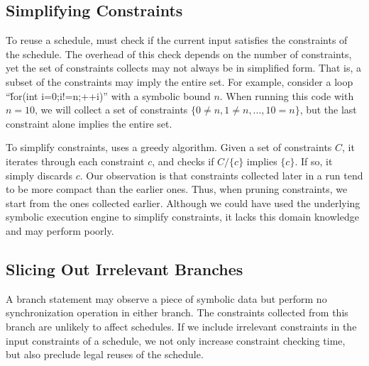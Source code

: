 



\subsection{Simplifying Constraints} \label{sec:tern-simplify}

To reuse a schedule, \tern must check if the current input satisfies the
constraints of the schedule.  The overhead of this check depends on the
number of constraints, yet the set of constraints \tern collects may not
always be in simplified form.  That is, a subset of the constraints may
imply the entire set.  For example, consider a loop ``\v{for(int
  i=0;i!=n;++i)}'' with a symbolic bound $n$.  When running this code with
$n=10$, we will collect a set of constraints $\{0 \neq n, 1 \neq n, ...,
10 = n\}$, but the last constraint alone implies the entire set.

To simplify constraints, \tern uses a greedy algorithm.  Given a set of
constraints $C$, it iterates through each constraint $c$, and checks if
$C/\{c\}$ implies $\{c\}$.  If so, it simply discards $c$.  Our
observation is that constraints collected later in a run tend to be more
compact than the earlier ones.  Thus, when pruning constraints, we start
from the ones collected earlier.  Although we could have used the
underlying symbolic execution engine to simplify constraints, it lacks
this domain knowledge and may perform poorly.

\subsection{Slicing Out Irrelevant Branches} \label{sec:tern-slicing}

A branch statement may observe a piece of symbolic data but perform no
synchronization operation in either branch.  The constraints collected
from this branch are unlikely to affect schedules.  If we include
irrelevant constraints in the input constraints of a schedule, we not only
increase constraint checking time, but also preclude legal reuses of the
schedule.


